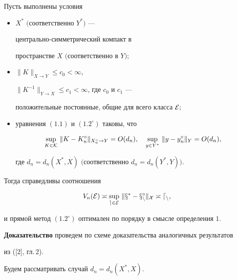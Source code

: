 \begin{thms}


Пусть выполнены условия


\begin{itemize}


\item[а)] $X^*$ $($соответственно $Y^*)$ ---


центрально-симметрический компакт в


пространстве $X$ $($соответственно в $Y);$


\item[б)] $\| K \|_{X\rightarrow Y}\leq c_0 < \infty$,


$\| K^{-1}\|_{Y\rightarrow X}\leq c_1 <\infty$, где $c_0$ и $c_1$ ---


положительные постоянные, общие для всего класса $\cal E;$


\item[в)] уравнения $(1.1)$ и $(1.2^\circ)$ таковы, что


$$


\sup_{K\in \cal K}\, \| K-K_n^\circ\|_{X_n^\circ \rightarrow Y}


=O(d_n),\quad \sup_{y\in Y^*}\, \|y-y_n^\circ\|_Y =O(d_n),


$$


где $d_n = d_n(X^*, X)$ $($соответственно $d_n = d_n (Y^*, Y))$.


\end{itemize}


Тогда справедливы соотношения


\begin{equation}


V_n(\cal E)\asymp \sup_{e\in \cal E}\, \|x^*-x_n^\circ\|_X


\asymp d_n,


\end{equation}


и прямой метод $(1.2^\circ)$ оптимален по порядку в смысле определения $1$.


\end{thms}





{\bf Доказательство} проведем по схеме доказательства аналогичных результатов


из ([2], гл.\,2).





Будем рассматривать случай $d_n = d_n(X^*, X)$.


